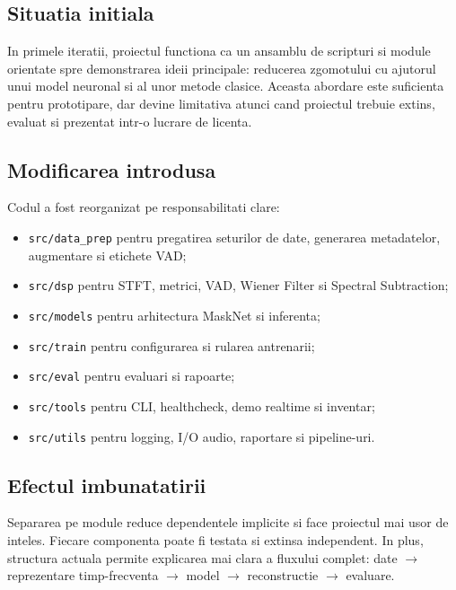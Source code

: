 \documentclass[12pt,a4paper]{article}
\begin{document}
\subsection{Situatia initiala}

In primele iteratii, proiectul functiona ca un ansamblu de scripturi si module
orientate spre demonstrarea ideii principale: reducerea zgomotului cu ajutorul
unui model neuronal si al unor metode clasice. Aceasta abordare este suficienta
pentru prototipare, dar devine limitativa atunci cand proiectul trebuie extins,
evaluat si prezentat intr-o lucrare de licenta.

\subsection{Modificarea introdusa}

Codul a fost reorganizat pe responsabilitati clare:

\begin{itemize}
    \item \texttt{src/data\_prep} pentru pregatirea seturilor de date, generarea
    metadatelor, augmentare si etichete VAD;
    \item \texttt{src/dsp} pentru STFT, metrici, VAD, Wiener Filter si Spectral
    Subtraction;
    \item \texttt{src/models} pentru arhitectura MaskNet si inferenta;
    \item \texttt{src/train} pentru configurarea si rularea antrenarii;
    \item \texttt{src/eval} pentru evaluari si rapoarte;
    \item \texttt{src/tools} pentru CLI, healthcheck, demo realtime si inventar;
    \item \texttt{src/utils} pentru logging, I/O audio, raportare si pipeline-uri.
\end{itemize}

\subsection{Efectul imbunatatirii}

Separarea pe module reduce dependentele implicite si face proiectul mai usor de
inteles. Fiecare componenta poate fi testata si extinsa independent. In plus,
structura actuala permite explicarea mai clara a fluxului complet: date
$\rightarrow$ reprezentare timp-frecventa $\rightarrow$ model $\rightarrow$
reconstructie $\rightarrow$ evaluare.
\end{document}
